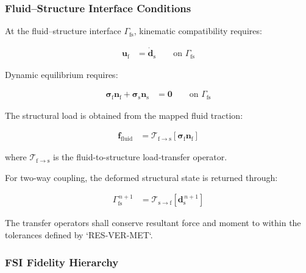 
\subsubsection{Fluid--Structure Interface Conditions}
\label{sec:res-str-fsi-interface-conditions}

At the fluid--structure interface $\Gamma_{\mathrm{fs}}$, kinematic
compatibility requires:

\begin{align}
  \mathbf{u}_{\mathrm{f}}
  &=
  \dot{\mathbf{d}}_{\mathrm{s}}
  \qquad
  \text{on }
  \Gamma_{\mathrm{fs}}
  \label{eq:res-str-fsi-kinematic-compatibility}
\end{align}

Dynamic equilibrium requires:

\begin{align}
  \boldsymbol{\sigma}_{\mathrm{f}}
  \mathbf{n}_{\mathrm{f}}
  +
  \boldsymbol{\sigma}_{\mathrm{s}}
  \mathbf{n}_{\mathrm{s}}
  &=
  \mathbf{0}
  \qquad
  \text{on }
  \Gamma_{\mathrm{fs}}
  \label{eq:res-str-fsi-traction-equilibrium}
\end{align}

The structural load is obtained from the mapped fluid traction:

\begin{align}
  \mathbf{f}_{\mathrm{fluid}}
  &=
  \mathcal{T}_{\mathrm{f}\rightarrow\mathrm{s}}
  \left[
    \boldsymbol{\sigma}_{\mathrm{f}}
    \mathbf{n}_{\mathrm{f}}
  \right]
  \label{eq:res-str-fsi-fluid-to-structure-transfer}
\end{align}

where $\mathcal{T}_{\mathrm{f}\rightarrow\mathrm{s}}$ is the
fluid-to-structure load-transfer operator.

For two-way coupling, the deformed structural state is returned through:

\begin{align}
  \Gamma_{\mathrm{fs}}^{\,n+1}
  &=
  \mathcal{T}_{\mathrm{s}\rightarrow\mathrm{f}}
  \left[
    \mathbf{d}_{\mathrm{s}}^{\,n+1}
  \right]
  \label{eq:res-str-fsi-structure-to-fluid-transfer}
\end{align}

The transfer operators shall conserve resultant force and moment to
within the tolerances defined by `RES-VER-MET`.

\subsubsection{FSI Fidelity Hierarchy}
\label{sec:res-str-fsi-fidelity-hierarchy}

